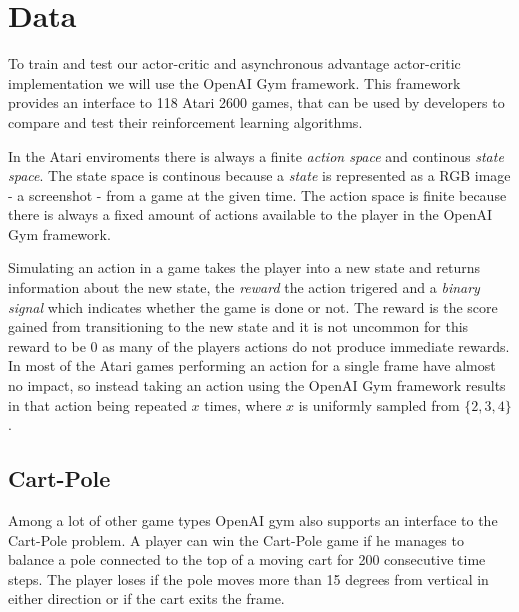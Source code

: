 \documentclass[11pt]{article}
\begin{document}
\maketitle

\section{Data}\label{Data}

To train and test our actor-critic and asynchronous advantage actor-critic implementation we will use
the OpenAI Gym framework\cite{openAIGym}.
This framework provides an interface to 118 Atari 2600 games,
that can be used by developers to compare and test their reinforcement learning algorithms.

 
In the Atari enviroments there is always a finite \textit{action space} and continous \textit{state space}.
The state space is continous because a \textit{state} is represented as a RGB image - a screenshot - from a game
at the given time. The action space is finite because there is always a fixed amount of
actions available to the player in the OpenAI Gym framework.

Simulating an action in a game takes the player into a new state
and returns information about the new state,
the \textit{reward} the action trigered and a \textit{binary signal} which indicates whether the 
game is done or not.
The reward is the score gained from transitioning to the new state and
it is not uncommon for this reward to be $0$ as many of the players actions do not produce immediate rewards.
In most of the Atari games performing an action for a single frame have almost no impact,
so instead taking an action using the OpenAI Gym framework
results in that action being repeated $x$ times, where $x$ is uniformly sampled from $\{2, 3, 4\}$.

\subsection{Cart-Pole}

Among a lot of other game types OpenAI gym also supports an interface
to the Cart-Pole problem.
A player can win the Cart-Pole game if he manages to balance a pole connected to the top of a moving cart for
200 consecutive time steps.
The player loses if the pole moves more than 15 degrees from vertical in
either direction or if the cart exits the frame.
\end{document}
